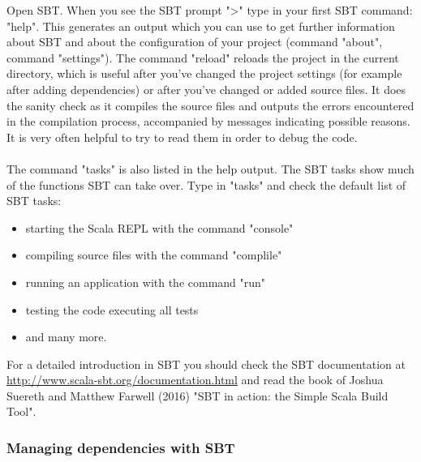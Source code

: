 \documentclass {article}
\begin{document}
Open SBT. When you see the SBT prompt ">" type in your first SBT command: "help". 
This generates an output which you can use to get further information about SBT and about the configuration of your project (command "about", command "settings"). 
The command "reload" reloads the project in the current directory, which is useful after you've changed the project settings (for example after adding dependencies) or after you've changed or added source files.
 It does the sanity check as it compiles the source files and outputs the errors encountered in the compilation process, accompanied by messages indicating possible reasons. 
It is very often helpful to try to read them in order to debug the code. 
\\
\\ 
The command "tasks" is also listed in the help output.
 The SBT tasks show much of the functions SBT can take over.
 Type in "tasks" and check the default list of SBT tasks:
\begin{itemize} 
\item starting the Scala REPL with the command "console"
\item compiling source files with the command "complile"
\item running an application with the command "run" 
\item testing the code executing all tests
\item and many more.
\end{itemize}
For a detailed introduction in SBT you should check the SBT documentation at \href{http://www.scala-sbt.org/documentation.html}{http://www.scala-sbt.org/documentation.html} and read the book of Joshua Suereth and Matthew Farwell (2016) "SBT in action: the Simple Scala Build Tool". 

\subsubsection {Managing dependencies with SBT}
\end{document}
